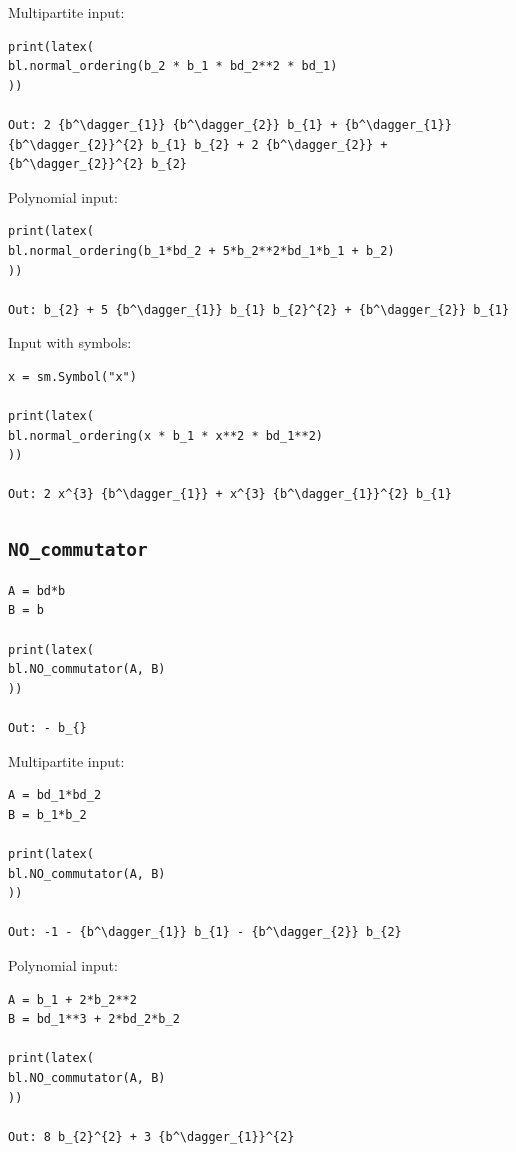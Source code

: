 \documentclass[onecolumn, 12pt, sort&compress]{elsarticle}
\newcommand{\inlinecode}[1]{\texttt{#1}}
\begin{document}
\noindent Multipartite input:
\begin{verbatim}
print(latex(
bl.normal_ordering(b_2 * b_1 * bd_2**2 * bd_1)
))

Out: 2 {b^\dagger_{1}} {b^\dagger_{2}} b_{1} + {b^\dagger_{1}} {b^\dagger_{2}}^{2} b_{1} b_{2} + 2 {b^\dagger_{2}} + {b^\dagger_{2}}^{2} b_{2}
\end{verbatim}

\noindent Polynomial input:
\begin{verbatim}
print(latex(
bl.normal_ordering(b_1*bd_2 + 5*b_2**2*bd_1*b_1 + b_2)
))

Out: b_{2} + 5 {b^\dagger_{1}} b_{1} b_{2}^{2} + {b^\dagger_{2}} b_{1}
\end{verbatim}

\newpage
\noindent Input with symbols:
\begin{verbatim}
x = sm.Symbol("x")

print(latex(
bl.normal_ordering(x * b_1 * x**2 * bd_1**2)
))

Out: 2 x^{3} {b^\dagger_{1}} + x^{3} {b^\dagger_{1}}^{2} b_{1}
\end{verbatim}


\subsection{\inlinecode{NO_commutator}}

\begin{verbatim}
A = bd*b
B = b

print(latex(
bl.NO_commutator(A, B)
))

Out: - b_{}     
\end{verbatim}

\noindent Multipartite input:
\begin{verbatim}
A = bd_1*bd_2
B = b_1*b_2

print(latex(
bl.NO_commutator(A, B)
))

Out: -1 - {b^\dagger_{1}} b_{1} - {b^\dagger_{2}} b_{2}
\end{verbatim}

\noindent Polynomial input:
\begin{verbatim}
A = b_1 + 2*b_2**2
B = bd_1**3 + 2*bd_2*b_2

print(latex(
bl.NO_commutator(A, B)
))

Out: 8 b_{2}^{2} + 3 {b^\dagger_{1}}^{2}
\end{verbatim}
\end{document}
